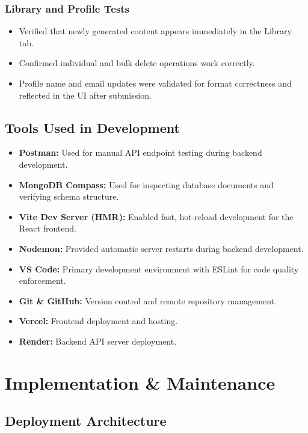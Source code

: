 \documentclass[12pt,a4paper]{article}
\begin{document}
\subsubsection{Library and Profile Tests}
\begin{itemize}
    \item Verified that newly generated content appears immediately in the Library tab.
    \item Confirmed individual and bulk delete operations work correctly.
    \item Profile name and email updates were validated for format correctness and reflected in the UI after submission.
\end{itemize}

\subsection{Tools Used in Development}

\begin{itemize}
    \item \textbf{Postman:} Used for manual API endpoint testing during backend development.
    \item \textbf{MongoDB Compass:} Used for inspecting database documents and verifying schema structure.
    \item \textbf{Vite Dev Server (HMR):} Enabled fast, hot-reload development for the React frontend.
    \item \textbf{Nodemon:} Provided automatic server restarts during backend development.
    \item \textbf{VS Code:} Primary development environment with ESLint for code quality enforcement.
    \item \textbf{Git \& GitHub:} Version control and remote repository management.
    \item \textbf{Vercel:} Frontend deployment and hosting.
    \item \textbf{Render:} Backend API server deployment.
\end{itemize}

\clearpage

\section{Implementation \& Maintenance}

\subsection{Deployment Architecture}
\end{document}

